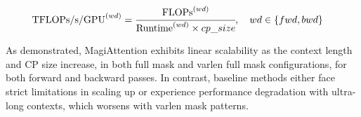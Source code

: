 \begin{align}
     \mathrm{TFLOPs/s/GPU}^{(wd)} &= \cfrac{\mathrm{FLOPs}^{(wd)}}{\mathrm{Runtime}^{(wd) }\times cp\_size}, \quad wd \in \{fwd, bwd\}
\end{align}


As demonstrated, MagiAttention exhibits linear scalability as the context length and CP size increase, in both full mask and varlen full mask configurations, for both forward and backward passes. In contrast, baseline methods either face strict limitations in scaling up or experience performance degradation with ultra-long contexts, which worsens with varlen mask patterns.



